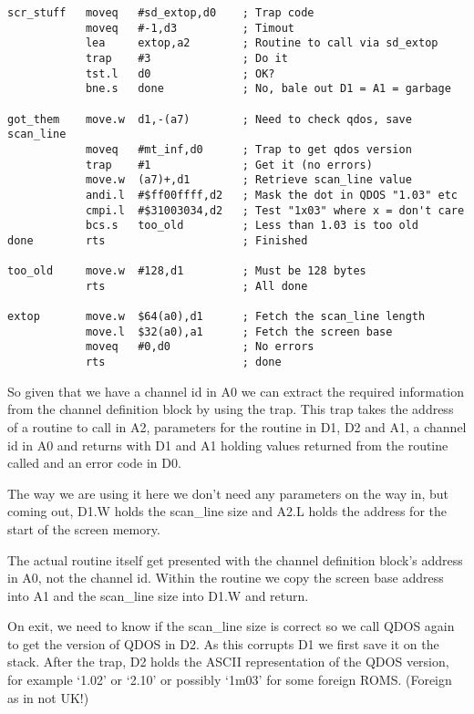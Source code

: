 \begin{lstlisting}[firstnumber=1,caption={Obtaining the Screen Address with SD\_EXTOP},label={lst:ObtainingTheScreenAddressWithSdextop}]
scr_stuff   moveq   #sd_extop,d0    ; Trap code
            moveq   #-1,d3          ; Timout
            lea     extop,a2        ; Routine to call via sd_extop
            trap    #3              ; Do it
            tst.l   d0              ; OK?
            bne.s   done            ; No, bale out D1 = A1 = garbage

got_them    move.w  d1,-(a7)        ; Need to check qdos, save scan_line
            moveq   #mt_inf,d0      ; Trap to get qdos version
            trap    #1              ; Get it (no errors)
            move.w  (a7)+,d1        ; Retrieve scan_line value
            andi.l  #$ff00ffff,d2   ; Mask the dot in QDOS "1.03" etc
            cmpi.l  #$31003034,d2   ; Test "1x03" where x = don't care
            bcs.s   too_old         ; Less than 1.03 is too old
done        rts                     ; Finished

too_old     move.w  #128,d1         ; Must be 128 bytes
            rts                     ; All done

extop       move.w  $64(a0),d1      ; Fetch the scan_line length
            move.l  $32(a0),a1      ; Fetch the screen base
            moveq   #0,d0           ; No errors
            rts                     ; done
\end{lstlisting}

So given that we have a channel id in A0 we can extract the required
    information from the channel definition block by using the  trap.
    This trap takes the address of a routine to call in A2, parameters for the
    routine in D1, D2 and A1, a channel id in A0 and returns with D1 and A1
    holding values returned from the routine called and an error code in
    D0.

The way we are using it here we don't need any parameters on the way
    in, but coming out, D1.W holds the scan\_line size and A2.L holds the
    address for the start of the screen memory.

The actual routine itself get presented with the channel definition
    block's address in A0, not the channel id. Within the routine we copy the
    screen base address into A1 and the scan\_line size into D1.W and
    return.

On exit, we need to know if the scan\_line size is correct so we call
    QDOS again to get the version of QDOS in D2. As this corrupts D1 we first
    save it on the stack. After the trap, D2 holds the ASCII representation of
    the QDOS version, for example `1.02' or `2.10' or possibly `1m03' for some
    foreign ROMS. (Foreign as in not UK!)

